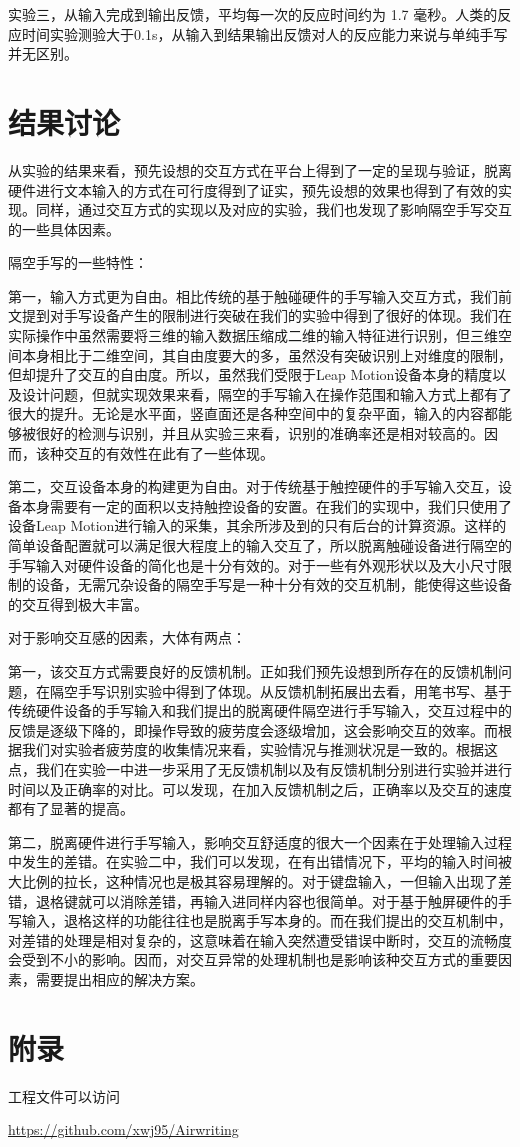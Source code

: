 \documentclass[10pt, twocolumn]{article}
\begin{document}
实验三，从输入完成到输出反馈，平均每一次的反应时间约为 1.7 毫秒。人类的反应时间实验测验大于0.1s，从输入到结果输出反馈对人的反应能力来说与单纯手写并无区别。


\section{结果讨论}
从实验的结果来看，预先设想的交互方式在平台上得到了一定的呈现与验证，脱离硬件进行文本输入的方式在可行度得到了证实，预先设想的效果也得到了有效的实现。同样，通过交互方式的实现以及对应的实验，我们也发现了影响隔空手写交互的一些具体因素。

隔空手写的一些特性：

第一，输入方式更为自由。相比传统的基于触碰硬件的手写输入交互方式，我们前文提到对手写设备产生的限制进行突破在我们的实验中得到了很好的体现。我们在实际操作中虽然需要将三维的输入数据压缩成二维的输入特征进行识别，但三维空间本身相比于二维空间，其自由度要大的多，虽然没有突破识别上对维度的限制，但却提升了交互的自由度。所以，虽然我们受限于Leap Motion设备本身的精度以及设计问题，但就实现效果来看，隔空的手写输入在操作范围和输入方式上都有了很大的提升。无论是水平面，竖直面还是各种空间中的复杂平面，输入的内容都能够被很好的检测与识别，并且从实验三来看，识别的准确率还是相对较高的。因而，该种交互的有效性在此有了一些体现。

第二，交互设备本身的构建更为自由。对于传统基于触控硬件的手写输入交互，设备本身需要有一定的面积以支持触控设备的安置。在我们的实现中，我们只使用了设备Leap Motion进行输入的采集，其余所涉及到的只有后台的计算资源。这样的简单设备配置就可以满足很大程度上的输入交互了，所以脱离触碰设备进行隔空的手写输入对硬件设备的简化也是十分有效的。对于一些有外观形状以及大小尺寸限制的设备，无需冗杂设备的隔空手写是一种十分有效的交互机制，能使得这些设备的交互得到极大丰富。

对于影响交互感的因素，大体有两点：

第一，该交互方式需要良好的反馈机制。正如我们预先设想到所存在的反馈机制问题，在隔空手写识别实验中得到了体现。从反馈机制拓展出去看，用笔书写、基于传统硬件设备的手写输入和我们提出的脱离硬件隔空进行手写输入，交互过程中的反馈是逐级下降的，即操作导致的疲劳度会逐级增加，这会影响交互的效率。而根据我们对实验者疲劳度的收集情况来看，实验情况与推测状况是一致的。根据这点，我们在实验一中进一步采用了无反馈机制以及有反馈机制分别进行实验并进行时间以及正确率的对比。可以发现，在加入反馈机制之后，正确率以及交互的速度都有了显著的提高。

第二，脱离硬件进行手写输入，影响交互舒适度的很大一个因素在于处理输入过程中发生的差错。在实验二中，我们可以发现，在有出错情况下，平均的输入时间被大比例的拉长，这种情况也是极其容易理解的。对于键盘输入，一但输入出现了差错，退格键就可以消除差错，再输入进同样内容也很简单。对于基于触屏硬件的手写输入，退格这样的功能往往也是脱离手写本身的。而在我们提出的交互机制中，对差错的处理是相对复杂的，这意味着在输入突然遭受错误中断时，交互的流畅度会受到不小的影响。因而，对交互异常的处理机制也是影响该种交互方式的重要因素，需要提出相应的解决方案。


\section{附录}
工程文件可以访问 

\href{https://github.com/xwj95/Airwriting}{https://github.com/xwj95/Airwriting}
\end{document}
